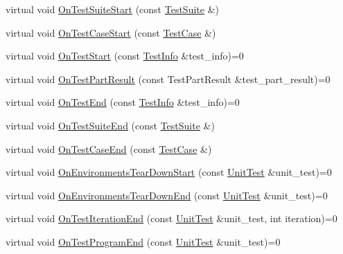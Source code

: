 \begin{DoxyCompactItemize}
\item 
virtual void \mbox{\hyperlink{classtesting_1_1_test_event_listener_a2726cc70dfda861f109355f1d9f09dfe}{On\+Test\+Suite\+Start}} (const \mbox{\hyperlink{classtesting_1_1_test_suite}{Test\+Suite}} \&)
\item 
virtual void \mbox{\hyperlink{classtesting_1_1_test_event_listener_ac48628c9f78d3e10bff77c7366e9e780}{On\+Test\+Case\+Start}} (const \mbox{\hyperlink{classtesting_1_1_test_case}{Test\+Case}} \&)
\item 
virtual void \mbox{\hyperlink{classtesting_1_1_test_event_listener_ab4f6a0ca16ae75daf385b3b5914e1048}{On\+Test\+Start}} (const \mbox{\hyperlink{classtesting_1_1_test_info}{Test\+Info}} \&test\+\_\+info)=0
\item 
virtual void \mbox{\hyperlink{classtesting_1_1_test_event_listener_a054f8705c883fa120b91473aff38f2ee}{On\+Test\+Part\+Result}} (const Test\+Part\+Result \&test\+\_\+part\+\_\+result)=0
\item 
virtual void \mbox{\hyperlink{classtesting_1_1_test_event_listener_abb1c44525ef038500608b5dc2f17099b}{On\+Test\+End}} (const \mbox{\hyperlink{classtesting_1_1_test_info}{Test\+Info}} \&test\+\_\+info)=0
\item 
virtual void \mbox{\hyperlink{classtesting_1_1_test_event_listener_a8962caad5d2522c9160c794074a662ee}{On\+Test\+Suite\+End}} (const \mbox{\hyperlink{classtesting_1_1_test_suite}{Test\+Suite}} \&)
\item 
virtual void \mbox{\hyperlink{classtesting_1_1_test_event_listener_a6cada1572dde8010b94f6dd237ce52f4}{On\+Test\+Case\+End}} (const \mbox{\hyperlink{classtesting_1_1_test_case}{Test\+Case}} \&)
\item 
virtual void \mbox{\hyperlink{classtesting_1_1_test_event_listener_a468b5e6701bcb86cb2c956caadbba5e4}{On\+Environments\+Tear\+Down\+Start}} (const \mbox{\hyperlink{classtesting_1_1_unit_test}{Unit\+Test}} \&unit\+\_\+test)=0
\item 
virtual void \mbox{\hyperlink{classtesting_1_1_test_event_listener_a9ea04fa7f447865ba76df35e12ba2092}{On\+Environments\+Tear\+Down\+End}} (const \mbox{\hyperlink{classtesting_1_1_unit_test}{Unit\+Test}} \&unit\+\_\+test)=0
\item 
virtual void \mbox{\hyperlink{classtesting_1_1_test_event_listener_a550fdb3e55726e4cefa09f5697941425}{On\+Test\+Iteration\+End}} (const \mbox{\hyperlink{classtesting_1_1_unit_test}{Unit\+Test}} \&unit\+\_\+test, int iteration)=0
\item 
virtual void \mbox{\hyperlink{classtesting_1_1_test_event_listener_ad15b6246d94c268e233487a86463ef3d}{On\+Test\+Program\+End}} (const \mbox{\hyperlink{classtesting_1_1_unit_test}{Unit\+Test}} \&unit\+\_\+test)=0

\end{DoxyCompactItemize}
